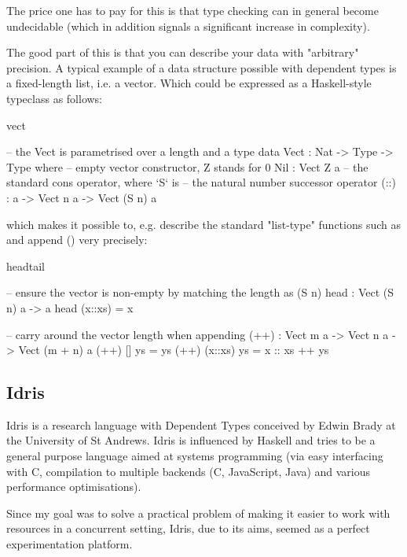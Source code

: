 The price one has to pay for this is that type checking can in general become
undecidable (which in addition signals a significant increase in complexity).

The good part of this is that you can describe your data with "arbitrary"
precision. A typical example of a data structure possible with dependent types
is a fixed-length list, i.e. a vector. Which could be expressed as
a Haskell-style typeclass as follows:

\begin{SaveVerbatim}{vect}

-- the Vect is parametrised over a length and a type
data Vect : Nat -> Type -> Type where
    -- empty vector constructor, Z stands for 0
    Nil  : Vect Z a
    -- the standard cons operator, where `S` is
    -- the natural number successor operator
    (::) : a -> Vect n a -> Vect (S n) a

\end{SaveVerbatim}

which makes it possible to, e.g. describe the standard "list-type" functions
such as  and append (\code{++}) very precisely:

\begin{SaveVerbatim}{headtail}

-- ensure the vector is non-empty by matching the length as (S n)
head : Vect (S n) a -> a
head (x::xs) = x

-- carry around the vector length when appending
(++) : Vect m a -> Vect n a -> Vect (m + n) a
(++) []      ys = ys
(++) (x::xs) ys = x :: xs ++ ys

\end{SaveVerbatim}

\subsection{Idris}

Idris is a research language with Dependent Types conceived by Edwin Brady at
the University of St Andrews. Idris is influenced by Haskell and tries to be a
general purpose language aimed at systems programming (via easy interfacing
with C, compilation to multiple backends (C, JavaScript, Java) and various
performance optimisations).

Since my goal was to solve a practical problem of making it easier to work with
resources in a concurrent setting, Idris, due to its aims, seemed as a perfect
experimentation platform.
